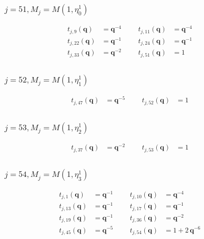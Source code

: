 \subsubsection{$j=51, M_{j}=M(1,\eta^{1}_{0})$}
\begin{align*}
t_{j,9}(\boldsymbol{q})&=\boldsymbol{q}^{-4} &&& t_{j,11}(\boldsymbol{q})&=\boldsymbol{q}^{-4} \\
t_{j,22}(\boldsymbol{q})&=\boldsymbol{q}^{-1} &&& t_{j,24}(\boldsymbol{q})&=\boldsymbol{q}^{-1} \\
t_{j,33}(\boldsymbol{q})&=\boldsymbol{q}^{-2} &&& t_{j,51}(\boldsymbol{q})&=1 \\
\end{align*}

\subsubsection{$j=52, M_{j}=M(1,\eta^{1}_{1})$}
\begin{align*}
t_{j,47}(\boldsymbol{q})&=\boldsymbol{q}^{-5} &&& t_{j,52}(\boldsymbol{q})&=1 \\
\end{align*}

\subsubsection{$j=53, M_{j}=M(1,\eta^{1}_{2})$}
\begin{align*}
t_{j,37}(\boldsymbol{q})&=\boldsymbol{q}^{-2} &&& t_{j,53}(\boldsymbol{q})&=1 \\
\end{align*}

\subsubsection{$j=54, M_{j}=M(1,\eta^{1}_{3})$}
\begin{align*}
t_{j,1}(\boldsymbol{q})&=\boldsymbol{q}^{-1} &&& t_{j,10}(\boldsymbol{q})&=\boldsymbol{q}^{-4} \\
t_{j,13}(\boldsymbol{q})&=\boldsymbol{q}^{-1} &&& t_{j,17}(\boldsymbol{q})&=\boldsymbol{q}^{-1} \\
t_{j,19}(\boldsymbol{q})&=\boldsymbol{q}^{-1} &&& t_{j,36}(\boldsymbol{q})&=\boldsymbol{q}^{-2} \\
t_{j,45}(\boldsymbol{q})&=\boldsymbol{q}^{-5} &&& t_{j,54}(\boldsymbol{q})&=1 + 2\,\boldsymbol{q}^{-6} \\
\end{align*}

